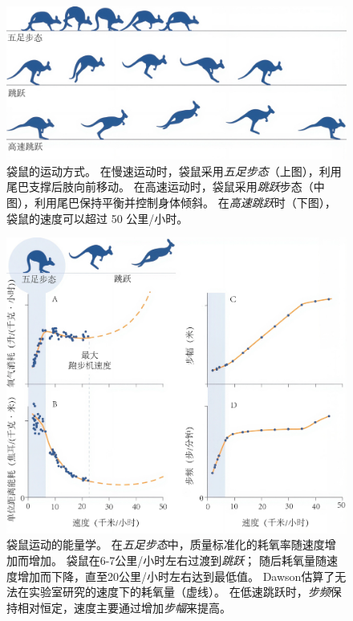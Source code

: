 \begin{figure}[!htb]
	\centering
	\includegraphics[width=1.0\linewidth]{chap3/3_6}
	\caption{袋鼠的运动方式。
		在慢速运动时，袋鼠采用\textit{五足步态}（上图），利用尾巴支撑后肢向前移动。
		在高速运动时，袋鼠采用\textit{跳跃}步态（中图），利用尾巴保持平衡并控制身体倾斜。
		在\textit{高速跳跃}时（下图），袋鼠的速度可以超过 50 公里/小时\cite{dawson1977kangaroos}。 \label{fig:3_6}}
\end{figure}


\begin{figure}[!htb]
	\centering
	\includegraphics[width=1.0\linewidth]{chap3/3_7}
	\caption{袋鼠运动的能量学。
		在\textit{五足步态}中，质量标准化的耗氧率随速度增加而增加。
		袋鼠在6-7公里/小时左右过渡到\textit{跳跃}；
		随后耗氧量随速度增加而下降，直至20公里/小时左右达到最低值。
		Dawson\cite{dawson1977kangaroos}估算了无法在实验室研究的速度下的耗氧量（虚线）。
		在低速跳跃时，\textit{步频}保持相对恒定，速度主要通过增加\textit{步幅}来提高\cite{dawson1977kangaroos}。 \label{fig:3_7}}
\end{figure}


